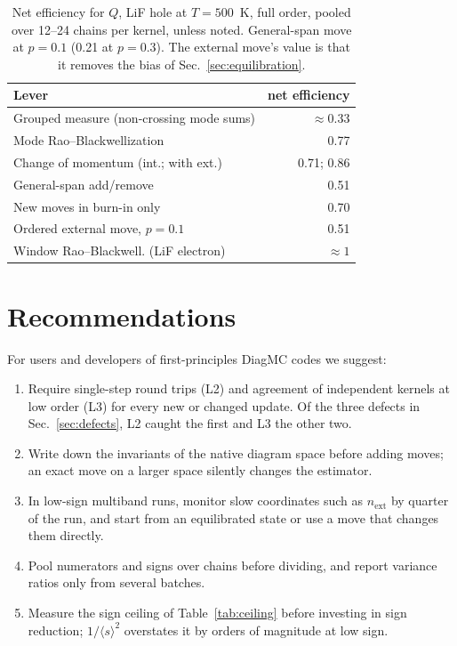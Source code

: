 \documentclass[aps,prb,reprint,superscriptaddress,nofootinbib]{revtex4-2}
\newcommand{\avg}[1]{\langle #1\rangle}
\begin{document}
\begin{table}
\caption{\label{tab:efficiency}Net efficiency for $Q$, LiF hole at $T=500$~K, full order, pooled over 12--24 chains per kernel, unless noted. General-span move at $p=0.1$ (0.21 at $p=0.3$). The external move's value is that it removes the bias of Sec.~\ref{sec:equilibration}.}
\begin{ruledtabular}
\begin{tabular}{lr}
Lever & net efficiency \\
\midrule
Grouped measure (non-crossing mode sums) & $\approx0.33$ \\
Mode Rao--Blackwellization & 0.77 \\
Change of momentum (int.; with ext.) & 0.71; 0.86 \\
General-span add/remove & 0.51 \\
New moves in burn-in only & 0.70 \\
Ordered external move, $p=0.1$ & 0.51 \\
Window Rao--Blackwell. (LiF electron) & $\approx1$ \\
\end{tabular}
\end{ruledtabular}
\end{table}

\section{Recommendations}

For users and developers of first-principles DiagMC codes we suggest:
\begin{enumerate}
\item Require single-step round trips (L2) and agreement of independent kernels at low order (L3) for every new or changed update. Of the three defects in Sec.~\ref{sec:defects}, L2 caught the first and L3 the other two.
\item Write down the invariants of the native diagram space before adding moves; an exact move on a larger space silently changes the estimator.
\item In low-sign multiband runs, monitor slow coordinates such as $n_{\mathrm{ext}}$ by quarter of the run, and start from an equilibrated state or use a move that changes them directly.
\item Pool numerators and signs over chains before dividing, and report variance ratios only from several batches.
\item Measure the sign ceiling of Table~\ref{tab:ceiling} before investing in sign reduction; $1/\avg{s}^2$ overstates it by orders of magnitude at low sign.
\end{enumerate}
\end{document}
